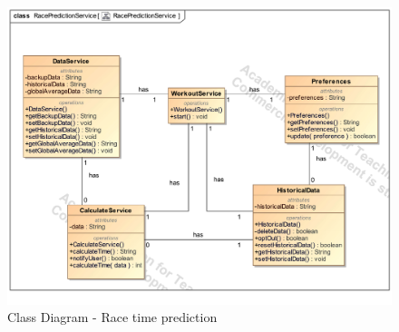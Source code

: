 \documentclass{article}
\begin{document}
		\clearpage
		\begin{figure}[h!]
			\centering
			\captionsetup{labelformat=empty}
			\caption{Class Diagram - Race time prediction}
		    	\includegraphics[width=\textwidth, angle=0]{Marc/race/RacePredictionServiceClass.pdf}
		\end{figure}
		\clearpage	
\end{document}
